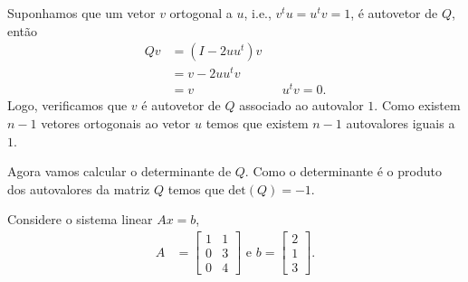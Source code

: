 \documentclass[a4paper,12pt, leqno, answers]{exam}
\begin{document}
\begin{questions}
\begin{solution}
       Suponhamos que um vetor $v$ ortogonal a $u$, i.e., $v^t u = u^t v = 1$, \'{e} autovetor de $Q$, ent\~{a}o
       \begin{align*}
           Q v &= \left( I - 2 u u^t \right) v \\
           &= v - 2 u u^t v \\
           &= v && u^t v = 0.
       \end{align*}
       Logo, verificamos que $v$ \'{e} autovetor de $Q$ associado ao autovalor $1$. Como existem $n - 1$ vetores ortogonais ao vetor $u$ temos que existem $n - 1$ autovalores iguais a $1$.

       Agora vamos calcular o determinante de $Q$. Como o determinante \'{e} o produto dos autovalores da matriz $Q$ temos que $\text{det}(Q) = -1$.
    \end{solution}

    \question Considere o sistema linear $A x = b$,
    \begin{align*}
        A &= \begin{bmatrix}
            1 & 1 \\
            0 & 3 \\
            0 & 4
        \end{bmatrix} \text{ e } b = \begin{bmatrix}
            2 \\
            1 \\
            3
        \end{bmatrix}.
    \end{align*}
    \begin{parts}

\end{parts}
\end{questions}
\end{document}
